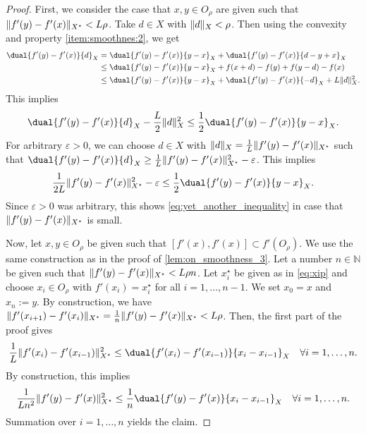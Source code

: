 \documentclass[
	english
]{scrartcl}
\numberwithin{equation}{section} %
\newif\ifbiber
\DeclarePairedDelimiter\norm{\lVert}{\rVert}
\newcommand\N{\mathbb{N}}
\newcommand{\dualspace}{^\star}
\begin{document}
\begin{proof}
First, we consider the case that
$x,y\in O_\rho$ are given
such that
$\norm{f'(y) - f'(x)}_{X\dualspace} < L\rho$.
Take $d\in X$ with $\norm{d}_X<\rho$. Then using the convexity and property \ref{item:smoothnes:2},
we get
\begin{align*}
	\dual{f'(y) - f'(x)}{d}_X
 &= \dual{f'(y)-f'(x)}{y-x}_X + \dual{f'(y)-f'(x)}{d-y+x}_X \\
 &\le \dual{f'(y)-f'(x)}{y-x}_X + f(x+d)-f(y) + f(y-d)-f(x) \\
 & \le  \dual{f'(y)-f'(x)}{y-x}_X + \dual{f'(y)-f'(x)}{-d}_X + L \norm{d}_X^2.
\end{align*}
This implies
\[
 \dual{f'(y)-f'(x)}{d}_X - \frac L2\norm{d}_X^2  \le \frac12\dual{f'(y)-f'(x)}{y-x}_X.
\]
For arbitrary $\varepsilon>0$, we can choose $d \in X$ with $\norm{d}_X = \frac1L\norm{f'(y) - f'(x)}_{X\dualspace}$ such that $\dual{f'(y)-f'(x)}{d}_X \ge \frac1L\norm{f'(y) - f'(x)}_{X\dualspace}^2 -\varepsilon$.
This implies
\[
 \frac 1{2L}\norm{f'(y) - f'(x)}_{X\dualspace}^2 -\varepsilon  \le \frac12\dual{f'(y)-f'(x)}{y-x}_X.
\]
Since $\varepsilon>0$ was arbitrary, this shows \eqref{eq:yet_another_inequality} in case that $\norm{f'(y) - f'(x)}_{X\dualspace}$ is small.

Now, let $x,y \in O_\rho$ be given such that
$[f'(x), f'(x)] \subset f'(O_\rho)$.
We use the same construction as in the proof of \cref{lem:on_smoothness_3}. Let a number $n\in \N$ be given such that
$\norm{f'(y) - f'(x)}_{X\dualspace} < L \rho n$.
Let $x_i\dualspace$ be given as in \eqref{eq:xip}
and choose $x_i \in O_\rho$ with 
$f'(x_i) = x_i\dualspace$ for all $i=1, \dots, n-1$.
We set $x_0=x$ and $x_n:=y$.
By construction, we have $\norm{f'(x_{i+1})-f'(x_i)}_{X\dualspace} = \frac1n \norm{f'(y) - f'(x)}_{X\dualspace} < L\rho$.
Then, the first part of the proof gives
\[
	\frac1L \norm{f'(x_i) - f'(x_{i-1})}_{X\dualspace}^2 \le \dual{f'(x_i)-f'(x_{i-1})}{x_i-x_{i-1}}_X \quad \forall i=1,\dots, n.
\]
By construction, this implies
\[
	\frac 1{Ln^2} \norm{f'(y) - f'(x)}_{X\dualspace}^2 \le \frac1{n}\dual{f'(y)-f'(x)}{x_i-x_{i-1}}_X \quad \forall i=1,\dots, n.
\]
Summation over $i=1,\dots, n$ yields the claim.
\end{proof}


\ifbiber
	\printbibliography
\else
	
	
\fi
\end{document}
